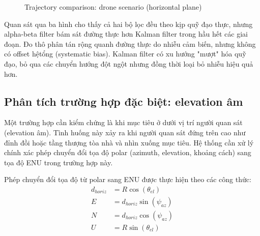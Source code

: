 \begin{figure}[H]
\centering
{}
\caption{Trajectory comparison: drone scenario (horizontal plane)}
\label{fig:traj-drone}
\end{figure}

Quan sát qua ba hình cho thấy cả hai bộ lọc đều theo kịp quỹ đạo thực, nhưng alpha-beta filter bám sát đường thực hơn Kalman filter trong hầu hết các giai đoạn. Đo thô phân tán rộng quanh đường thực do nhiễu cảm biến, nhưng không có offset hệtổng (systematic bias). Kalman filter có xu hướng "mượt" hóa quỹ đạo, bỏ qua các chuyển hướng đột ngột nhưng đồng thời loại bỏ nhiễu hiệu quả hơn.

\subsection{Phân tích trường hợp đặc biệt: elevation âm}

\hspace{0.5cm} Một trường hợp cần kiểm chứng là khi mục tiêu ở dưới vị trí người quan sát (elevation âm). Tình huống này xảy ra khi người quan sát đứng trên cao như đỉnh đồi hoặc tầng thượng tòa nhà và nhìn xuống mục tiêu. Hệ thống cần xử lý chính xác phép chuyển đổi tọa độ polar (azimuth, elevation, khoảng cách) sang tọa độ ENU trong trường hợp này.

Phép chuyển đổi tọa độ từ polar sang ENU được thực hiện theo các công thức:
\begin{align}
d_{horiz} &= R \cos(\theta_{el}) \label{eq:horiz-dist} \\
E &= d_{horiz} \sin(\psi_{az}) \label{eq:enu-east} \\
N &= d_{horiz} \cos(\psi_{az}) \label{eq:enu-north} \\
U &= R \sin(\theta_{el}) \label{eq:enu-up}
\end{align}

